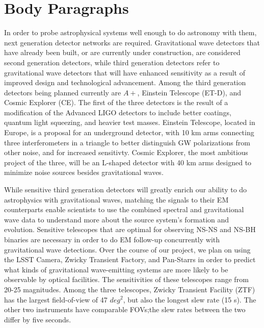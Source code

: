 \documentclass{article}
\begin{document}
\section{Body Paragraphs}

In order to probe astrophysical systems well enough to do astronomy with them, next generation detector networks are required.  Gravitational wave detectors that have already been built, or are currently under construction, are considered second generation detectors, while third generation detectors refer to gravitational wave detectors that will have enhanced sensitivity as a result of improved design and technological advancement.  Among the third generation detectors being planned currently are $A+$, Einstein Telescope (ET-D), and Cosmic Explorer (CE).  The first of the three detectors is the result of a modification of the Advanced LIGO detectors to include better coatings, quantum light squeezing, and heavier test masses.  Einstein Telescope, located in Europe, is a proposal for an underground detector, with 10 km arms connecting three interferometers in a triangle to better distinguish GW polarizations from other noise, and for increased sensitivty.  Cosmic Explorer, the most ambitious project of the three, will be an L-shaped detector with 40 km arms designed to minimize noise sources besides gravitational waves.    
 
While sensitive third generation detectors will greatly enrich our ability to do astrophysics with gravitational waves, matching the signals to their EM counterparts enable scientists to use the combined spectral and gravitational wave data to understand more about the source system's formation and evolution.  Sensitive telescopes that are optimal for observing NS-NS and NS-BH binaries are necessary in order to do EM follow-up concurrently with gravitational wave detections.  Over the course of our project, we plan on using the LSST Camera, Zwicky Transient Factory, and Pan-Starrs in order to predict what kinds of gravitational wave-emitting systems are more likely to be observable by optical facilities.  The sensitivities of these telescopes range from ~ 20-25 magnitudes.  Among the three telescopes, Zwicky Transient Facility (ZTF) has the largest field-of-view of 47 $deg^2$, but also the longest slew rate (15 s).  The other two instruments have comparable FOVs;the slew rates between the two differ by five seconds.  
\end{document}
